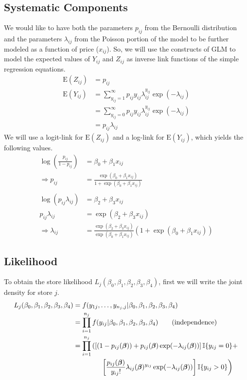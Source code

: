 \documentclass{article}\usepackage[]{graphicx}\usepackage[]{color}
\theoremstyle{plain}
\begin{document}
\subsection*{Systematic Components}
We would like to have both the parameters $p_{ij}$ from the Bernoulli distribution and the parameters $\lambda_{ij}$ from the Poisson portion of the model to be further modeled as a function of price ($x_{ij}$). So, we will use the constructs of GLM to model the expected values of $Y_{ij}$ and $Z_{ij}$ as inverse link functions of the simple regression equations.
\begin{align*}
\text{E}(Z_{ij}) &= p_{ij} \\
\text{E}(Y_{ij}) &= \sum\limits_{y_{ij} = 1}^\infty p_{ij} y_{ij} \lambda_{ij}^{y_{ij}} \exp(-\lambda_{ij}) \\
&= \sum\limits_{y_{ij} = 0}^\infty p_{ij} y_{ij} \lambda_{ij}^{y_{ij}} \exp(-\lambda_{ij}) \\
&= p_{ij} \lambda_{ij}
\end{align*}
We will use a logit-link for $\text{E}(Z_{ij}) $ and a log-link for $\text{E}(Y_{ij})$, which yields the following values.
\begin{align*}
\log\left( \frac{p_{ij}}{1-p_{ij}}\right) &= \beta_0 + \beta_1 x_{ij} \\ 
\Rightarrow p_{ij} &= \frac{\exp(\beta_0 + \beta_1 x_{ij})}{1 + \exp(\beta_0 + \beta_1 x_{ij})} \\
~\\
\log(p_{ij} \lambda_{ij}) &= \beta_2 + \beta_3 x_{ij} \\
p_{ij} \lambda_{ij} &= \exp(\beta_2 + \beta_3 x_{ij}) \\
\Rightarrow \lambda_{ij} &= \frac{ \exp(\beta_2 + \beta_3 x_{ij})}{ \exp(\beta_0 + \beta_1 x_{ij})} (1 +  \exp(\beta_0 + \beta_1 x_{ij}))
\end{align*}

\subsection*{Likelihood}
To obtain the store likelihood $L_j(\beta_0, \beta_1, \beta_2, \beta_3, \beta_4)$, first we will write the joint density for store $j$.
\begin{align*}
L_j(\beta_0, \beta_1, \beta_2, \beta_3, \beta_4) &= f(y_{1j}, \dots, y_{{n_j},j} | \beta_0, \beta_1, \beta_2, \beta_3, \beta_4) \\
&= \prod\limits_{i=1}^{n_j} f(y_{ij}|\beta_0, \beta_1, \beta_2, \beta_3, \beta_4) \tag{\text{independence}} \\
&= \prod\limits_{i=1}^{n_j} \left(\left[(1-p_{ij}(\boldsymbol \beta)) + p_{ij}(\boldsymbol \beta) \exp(-\lambda_{ij}(\boldsymbol \beta))\right] \mathbb{I}\{y_{ij} = 0\} + \right. \\
& \qquad \qquad \left. \left[ \frac{p_{ij}(\boldsymbol \beta)}{y_{ij} !} \lambda_{ij}(\boldsymbol \beta)^{y_{ij}}\exp(-\lambda_{ij}(\boldsymbol \beta)) \right]\mathbb{I}\{y_{ij} > 0\} \right)
\end{align*}
\end{document}
